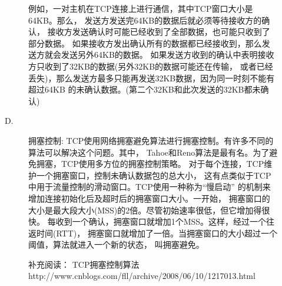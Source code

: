 \begin{description}
\begin{description}
    例如，一对主机在TCP连接上进行通信，其中TCP窗口大小是64KB。那么， 发送方发送完64KB的数据后就必须等待接收方的确认， 接收方发送确认时可能已经收到了全部数据，也可能只收到了部分数据。 如果接收方发出确认所有的数据都已经接收到，那么发送方就会发送另外64KB的数据。 如果发送方收到的确认中表明接收方只收到了32KB的数据(另外32KB的数据可能还在传输， 或者已经丢失)，那么发送方最多只能再发送32KB数据，因为同一时刻不能有超过64KB 的未确认数据。(第二个32KB和此次发送的32KB都未确认)

  \item[D.] 拥塞控制: TCP使用网络拥塞避免算法进行拥塞控制。有许多不同的算法可以解决这个问题。其中， Tahoe和Reno算法是最有名。为了避免拥塞，TCP使用多方位的拥塞控制策略。 对于每个连接，TCP维护一个拥塞窗口，控制未确认数据包的总大小， 这有点类似于TCP中用于流量控制的滑动窗口。TCP使用一种称为“慢启动” 的机制来增加连接初始化后及超时后的拥塞窗口大小。一开始， 拥塞窗口的大小是最大段大小(MSS)的2倍。尽管初始速率很低，但它增加得很快。 每收到一个确认，拥塞窗口就增加1个MSS。这样，经过一个往返时间(RTT)， 拥塞窗口就增加了一倍。当拥塞窗口的大小超过一个阈值，算法就进入一个新的状态， 叫拥塞避免。

    补充阅读： TCP拥塞控制算法 http://www.cnblogs.com/fll/archive/2008/06/10/1217013.html
  \end{description}
  \end{description}
